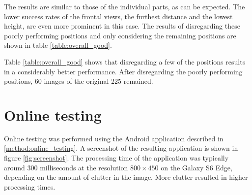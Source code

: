 



The results are similar to those of the individual parts, as can be expected.
The lower success rates of the frontal views, the furthest distance and the lowest height, are even more prominent in this case.
The results of disregarding these poorly performing positions and only considering the remaining positions are shown in table \ref{table:overall_good}.



Table \ref{table:overall_good} shows that disregarding a few of the positions results in a considerably better performance.
After disregarding the poorly performing positions, 60 images of the original 225 remained.

\section{Online testing} \label{results:online}

Online testing was performed using the Android application described in \ref{method:online_testing}.
A screenshot of the resulting application is shown in figure \ref{fig:screenshot}. %
The processing time of the application was typically around 300 milliseconds at the resolution $800 \times 450$ on the Galaxy S6 Edge, depending on the amount of clutter in the image. 
More clutter resulted in higher processing times.





